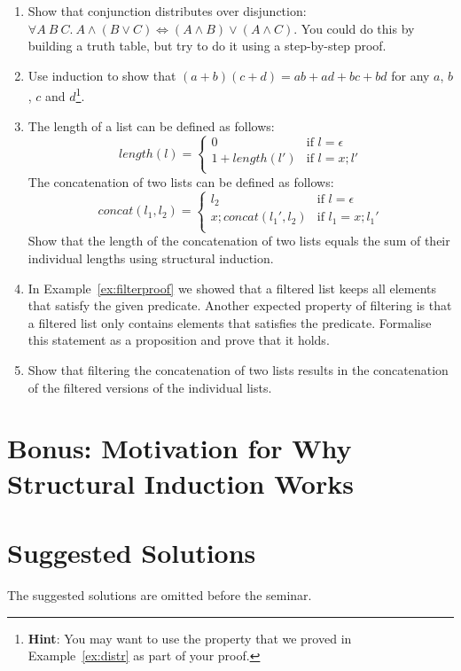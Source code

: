 \documentclass{tufte-handout}
\newcounter{theExerciseCounter}
\begin{document}
\begin{enumerate}
\setcounter{enumi}{\value{theExerciseCounter}}
\item Show that conjunction distributes over disjunction:\\
  $\forall A~B~C. ~A \land (B \lor C) \iff (A \land B) \lor (A
  \land C)$. You could do this by building a truth table, but try
  to do it using a step-by-step proof.
\item Use induction to show that
  $(a + b)(c + d) = ab + ad + bc + bd$ for any $a$, $b$, $c$ and
  $d$\footnote{\textbf{Hint}: You may want to use the property
    that we proved in Example~\ref{ex:distr} as part of your
    proof.}.
\item The length of a list can be defined as follows:
  \[
  \mathit{length}(l) =
  \begin{cases}
    0 & \text{if } l = \epsilon\\
    1 + \mathit{length}(l')& \text{if } l = x; l'\\
  \end{cases}
  \]
  The concatenation of two lists can be defined as follows:
  \[
  \mathit{concat}(l_1, l_2) =
  \begin{cases}
    l_2 & \text{if } l = \epsilon\\
    x; \mathit{concat}(l_1', l_2) & \text{if } l_1 = x; l_1'\\
  \end{cases}
  \]
  Show that the length of the concatenation of two lists equals
  the sum of their individual lengths using structural induction.
\item In Example~\ref{ex:filterproof} we showed that a filtered
  list keeps all elements that satisfy the given predicate.
  Another expected property of filtering is that a filtered list
  only contains elements that satisfies the predicate. Formalise
  this statement as a proposition and prove that it holds.
\item Show that filtering the concatenation of two lists results
  in the concatenation of the filtered versions of the individual
  lists.
\end{enumerate}

\section{Bonus: Motivation for Why Structural Induction Works}


\section{Suggested Solutions}

The suggested solutions are omitted before the seminar.
\end{document}
